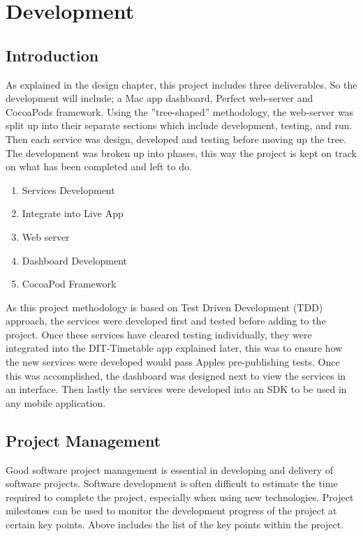 \chapter{Development}

\label{ch:conclusions}

\section{Introduction}

As explained in the design chapter, this project includes three deliverables. So the development will include; a Mac app dashboard, Perfect web-server and CocoaPods framework. Using the ”tree-shaped” methodology, the web-server was split up into their separate sections which include development, testing, and run. Then each service was design, developed and testing before moving up the tree. The development was broken up into phases, this way the project is kept on track on what has been completed and left to do.

\begin{enumerate}
  \item Services Development
  \item Integrate into Live App
  \item Web server 
  \item Dashboard Development
  \item CocoaPod Framework 
\end{enumerate}

As this project methodology is based on Test Driven Development (TDD) approach, the services were developed first and tested before adding to the project. Once these services have cleared testing individually, they were integrated into the DIT-Timetable app explained later, this was to ensure how the new services were developed would pass Apples pre-publishing tests. Once this was accomplished, the dashboard was designed next to view the services in an interface. Then lastly the services were developed into an SDK to be used in any mobile application.

\section{Project Management}

Good software project management is essential in developing and delivery of software projects. Software development is often difficult to estimate the time required to complete the project, especially when using new technologies. Project milestones can be used to monitor the development progress of the project at certain key points. Above includes the list of the key points within the project. 

